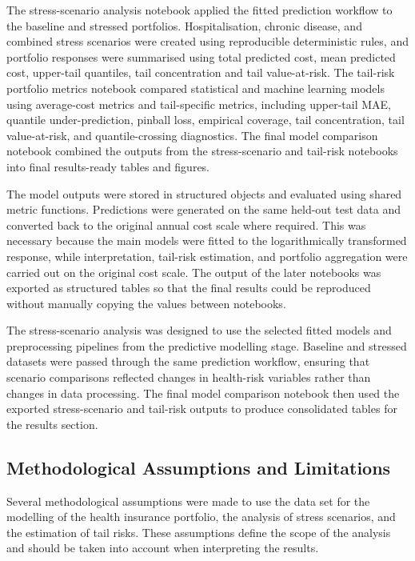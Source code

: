 	The stress-scenario analysis notebook applied the fitted prediction workflow to the baseline and stressed portfolios. Hospitalisation, chronic disease, and combined stress scenarios were created using reproducible deterministic rules, and portfolio responses were summarised using total predicted cost, mean predicted cost, upper-tail quantiles, tail concentration and tail value-at-risk. The tail-risk portfolio metrics notebook compared statistical and machine learning models using average-cost metrics and tail-specific metrics, including upper-tail MAE, quantile under-prediction, pinball loss, empirical coverage, tail concentration, tail value-at-risk, and quantile-crossing diagnostics. The final model comparison notebook combined the outputs from the stress-scenario and tail-risk notebooks into final results-ready tables and figures.
	
	The model outputs were stored in structured objects and evaluated using shared metric functions. Predictions were generated on the same held-out test data and converted back to the original annual cost scale where required. This was necessary because the main models were fitted to the logarithmically transformed response, while interpretation, tail-risk estimation, and portfolio aggregation were carried out on the original cost scale. The output of the later notebooks was exported as structured tables so that the final results could be reproduced without manually copying the values between notebooks.
	
	The stress-scenario analysis was designed to use the selected fitted models and preprocessing pipelines from the predictive modelling stage. Baseline and stressed datasets were passed through the same prediction workflow, ensuring that scenario comparisons reflected changes in health-risk variables rather than changes in data processing. The final model comparison notebook then used the exported stress-scenario and tail-risk outputs to produce consolidated tables for the results section.
	
	\subsection{Methodological Assumptions and Limitations}
	
	Several methodological assumptions were made to use the data set for the modelling of the health insurance portfolio, the analysis of stress scenarios, and the estimation of tail risks. These assumptions define the scope of the analysis and should be taken into account when interpreting the results.
	
